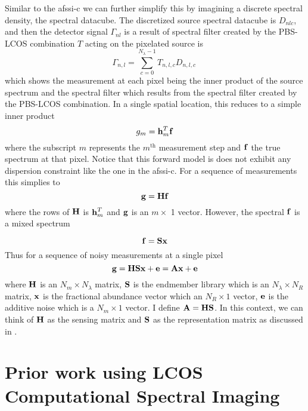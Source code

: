 Similar to the \gls{afssi-c} we can further simplify this by imagining a discrete spectral density, the spectral datacube. The discretized source spectral datacube is $D_{nlc}$, and then the detector signal $\Gamma_{nl}$ is a result of spectral filter created by the PBS-LCOS combination $T$ acting on the pixelated source is
%
%
\begin{equation}
	\Gamma_{n,l} = \sum^{N_{\lambda}-1}_{c = 0} T_{n,l,c} D_{n,l,c} \,
\end{equation}
%
%
which shows the measurement at each pixel being the inner product of the source spectrum and the spectral filter which results from the spectral filter created by the PBS-LCOS combination. In a single spatial location, this reduces to a simple inner product
%
\begin{equation}
	g_m = \displaystyle \mathbf{h}_m^{T} \displaystyle \mathbf{f} 
\end{equation}
%
where the subscript $m$ represents the $m^{\text{th}}$ measurement step and $\displaystyle \mathbf{f}$ the true spectrum at that pixel. Notice that this forward model is does not exhibit any dispersion constraint like the one in the \gls{afssi-c}. For a sequence of measurements this simplies to 
%
\begin{equation}
	\displaystyle \mathbf{g} = \displaystyle \mathbf{H} \displaystyle \mathbf{f}
\end{equation}
%
where the rows of $\displaystyle \mathbf{H}$ is $\displaystyle \mathbf{h}_m^T$ and $\displaystyle \mathbf{g}$ is an $m \times$ 1 vector. However, the spectral $\displaystyle \mathbf{f}$ is a mixed spectrum

\begin{equation}
	\displaystyle \mathbf{f} = \displaystyle \mathbf{S}\displaystyle \mathbf{x}
\end{equation}
%
Thus for a sequence of noisy measurements at a single pixel
%
\begin{equation}
	\displaystyle \mathbf{g} = \displaystyle \mathbf{H}\displaystyle \mathbf{S}\displaystyle \mathbf{x} + \displaystyle \mathbf{e} = \displaystyle \mathbf{A}\displaystyle \mathbf{x} + \displaystyle \mathbf{e}
\end{equation}\label{eq:csuForwardModel}
%
where $\displaystyle \mathbf{H}$ is an $N_m \times N_{\lambda}$ matrix, $\displaystyle \mathbf{S}$ is the endmember library which is an $N_{\lambda} \times N_{R}$ matrix, $\displaystyle \mathbf{x}$ is the fractional abundance vector which an $N_R \times 1$ vector, $\displaystyle \mathbf{e}$ is the additive noise which is a $N_m \times 1$ vector. I define $\displaystyle \mathbf{A} = \displaystyle \mathbf{H} \displaystyle \mathbf{S}$. In this context, we can think of $\displaystyle \mathbf{H}$ as the sensing matrix and $\displaystyle \mathbf{S}$ as the representation matrix as discussed in .

\section{Prior work using LCOS Computational Spectral Imaging}

